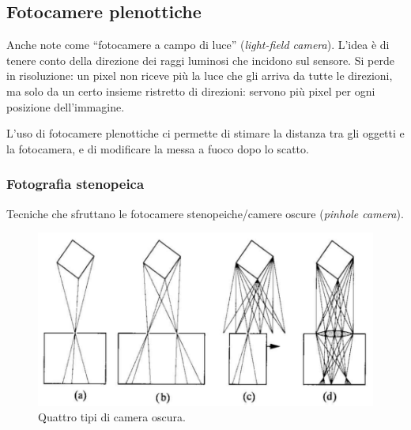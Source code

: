 \documentclass[a4paper,11pt]{article}
\begin{document}
\subsection{Fotocamere plenottiche}
Anche note come ``fotocamere a campo di luce'' (\textit{light-field camera}). L'idea è di tenere conto della direzione dei raggi luminosi che incidono
sul sensore. Si perde in risoluzione: un pixel non riceve più la luce che gli arriva da tutte le direzioni,
ma solo da un certo insieme ristretto di direzioni: servono più pixel per ogni posizione dell'immagine.
\par
L'uso di fotocamere plenottiche ci permette di stimare la distanza tra gli oggetti e la fotocamera, e di modificare la messa a fuoco dopo lo scatto.

\subsubsection{Fotografia stenopeica}
Tecniche che sfruttano le fotocamere stenopeiche/camere oscure (\textit{pinhole camera}).

\renewcommand{\thefigure}{3.22}
\begin{figure}[!h]
  \centering
    \includegraphics[scale=0.4]{images/3/pinholes.png}
    \caption{Quattro tipi di camera oscura.}
\end{figure}
\end{document}
